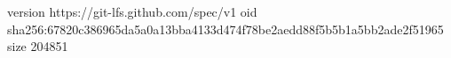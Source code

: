 version https://git-lfs.github.com/spec/v1
oid sha256:67820c386965da5a0a13bba4133d474f78be2aedd88f5b5b1a5bb2ade2f51965
size 204851
